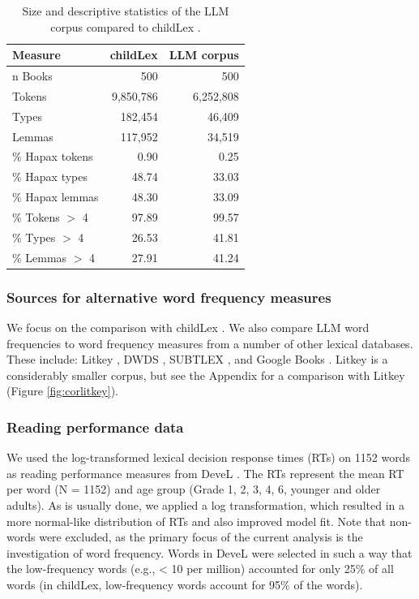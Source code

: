 \documentclass[manuscript]{stjour}
\begin{document}
\begin{table}[ht]
\caption{Size and descriptive statistics of the LLM corpus compared to childLex \citep{schroeder_childlex_2015}.}
\centering
\begin{tabular}{lrr}
  \hline
Measure & childLex & LLM corpus \\ 
  \hline
n Books & 500 & 500 \\ 
  Tokens & 9,850,786 & 6,252,808 \\ 
  Types & 182,454 & 46,409 \\ 
  Lemmas & 117,952 & 34,519 \\ 
  \% Hapax tokens & 0.90 & 0.25 \\ 
  \% Hapax types & 48.74 & 33.03 \\ 
  \% Hapax lemmas & 48.30 & 33.09 \\ 
  \% Tokens $>$ 4 & 97.89 & 99.57 \\ 
  \% Types $>$ 4 & 26.53 & 41.81 \\ 
  \% Lemmas $>$ 4 & 27.91 & 41.24 \\ 
   \hline
\end{tabular}
\label{freqComp}
\end{table}


\subsubsection*{Sources for alternative word frequency measures}

We focus on the comparison with childLex \citep{schroeder_childlex_2015}. We also compare LLM word frequencies to word frequency measures from a number of other lexical databases. These include: Litkey \citep{laarmann-quante_litkey_2019}, DWDS \citep{heister_dlexdb_2011}, SUBTLEX \citep{brysbaert_word_2011}, and Google Books \citep{brysbaert_impact_2016}. Litkey is a considerably smaller corpus, but see the Appendix for a comparison with Litkey (Figure \ref{fig:corlitkey}). 


\subsubsection*{Reading performance data}

We used the log-transformed lexical decision response times (RTs) on 1152 words as reading performance measures from DeveL \citep{schroter_developmental_2017}. The RTs represent the mean RT per word (N = 1152) and age group (Grade 1, 2, 3, 4, 6, younger and older adults). As is usually done, we applied a log transformation, which resulted in a more normal-like distribution of RTs and also improved model fit. Note that non-words were excluded, as the primary focus of the current analysis is the investigation of word frequency. Words in DeveL were selected in such a way that the low-frequency words (e.g., < 10 per million) accounted for only 25\% of all words (in childLex, low-frequency words account for 95\% of the words).  
\end{document}
